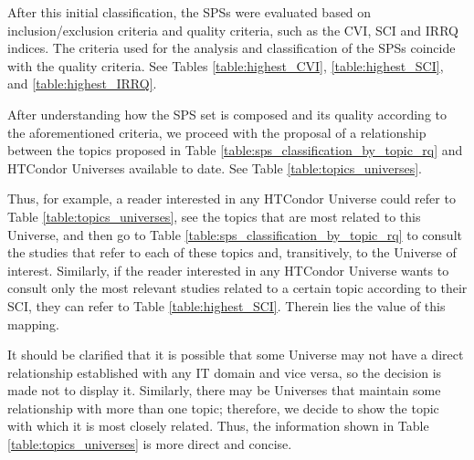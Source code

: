 After this initial classification, the SPSs were evaluated based on inclusion/exclusion criteria and quality criteria, such as the CVI, SCI and IRRQ indices. The criteria used for the analysis and classification of the SPSs coincide with the quality criteria. See Tables \ref{table:highest_CVI}, \ref{table:highest_SCI}, and \ref{table:highest_IRRQ}.

After understanding how the SPS set is composed and its quality according to the aforementioned criteria, we proceed with the proposal of a relationship between the topics proposed in Table \ref{table:sps_classification_by_topic_rq} and HTCondor Universes available to date. See Table \ref{table:topics_universes}.

Thus, for example, a reader interested in any HTCondor Universe could refer to Table \ref{table:topics_universes}, see the topics that are most related to this Universe, and then go to Table \ref{table:sps_classification_by_topic_rq} to consult the studies that refer to each of these topics and, transitively, to the Universe of interest. Similarly, if the reader interested in any HTCondor Universe wants to consult only the most relevant studies related to a certain topic according to their SCI, they can refer to Table \ref{table:highest_SCI}. Therein lies the value of this mapping.

It should be clarified that it is possible that some Universe may not have a direct relationship established with any IT domain and vice versa, so the decision is made not to display it. Similarly, there may be Universes that maintain some relationship with more than one topic; therefore, we decide to show the topic with which it is most closely related. Thus, the information shown in Table \ref{table:topics_universes} is more direct and concise.

